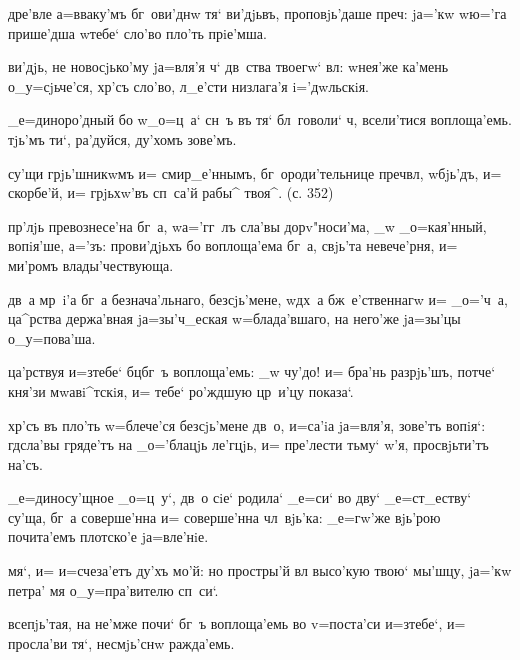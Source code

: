 дре'вле а=вваку'мъ бг~ови'днw тя` ви'дjьвъ, проповjь'даше 
преч: jа='кw w\т ю='га прише'дша w\т тебе` сло'во 
пло'ть прiе'мша.

ви'дjь, не новосjько'му jа=вля'я ч` дв~ства твоегw` 
вл: w\т нея'же ка'мень о_у=сjьче'ся, хр'съ 
сло'во, л_е'сти низлага'я i='дwльскiя.

_е=диноро'дный бо w\т _о=ц~а` сн~ъ въ тя` бл~говоли` 
ч, всели'тися воплоща'емь. тjь'мъ ти`, ра'дуйся, 
ду'хомъ зове'мъ.

су'щи грjь'шникwмъ и= смир_е'ннымъ, бг~ороди'тельнице 
преч вл, w\т бjь'дъ, и= скорбе'й, и= грjьхw'въ 
сп~са'й рабы^ твоя^. (с. 352)


пр'лjь превознесе'на бг~а, w\т а='гг~лъ сла'вы 
дорv"носи'ма, _w _о=кая'нный, вопiя'ше, а='зъ: 
прови'дjьхъ бо воплоща'ема бг~а, свjь'та невече'рня, и= 
ми'ромъ влады'чествующа.

дв~а мр~i'а бг~а безнача'льнаго, без\ъ сjь'мене, w\т дх~а 
бж~е'ственнагw и= _о='ч~а, ца^рства держа'вная 
jа=зы'ч_еская w=блада'вшаго, на него'же jа=зы'цы 
о_у=пова'ша.

ца'рствуя и=з\ъ тебе` бц бг~ъ воплоща'емь: _w чу'до! 
и= бра'нь разрjь'шъ, потче` кня'зи мwавi^тскiя, и= тебе` 
ро'ждшую цр~и'цу показа`.

хр'съ въ пло'ть w=блече'ся без\ъ сjь'мене дв~о, 
и=са'iа jа=вля'я, зове'тъ вопiя`: гд сла'вы гряде'тъ 
на _о='блацjь ле'гцjь, и= пре'лести тьму` w'я, 
просвjьти'тъ на'съ.

_е=диносу'щное _о=ц~у`, дв~о сiе` родила` _е=си` во дву` 
_е=ст_еству` су'ща, бг~а соверше'нна и= соверше'нна 
чл~вjь'ка: _е=гw'же вjь'рою почита'емъ плотско'е 
jа=вле'нiе.


мя`, и= и=счеза'етъ ду'хъ мо'й: но простры'й вл 
высо'кую твою` мы'шцу, jа='кw петра' мя о_у=пра'вителю 
сп~си`.

всепjь'тая, на не'мже почи` бг~ъ воплоща'емь во 
v=поста'си и=з\ъ тебе`, и= просла'ви тя`, несмjь'снw 
ражда'емь.

